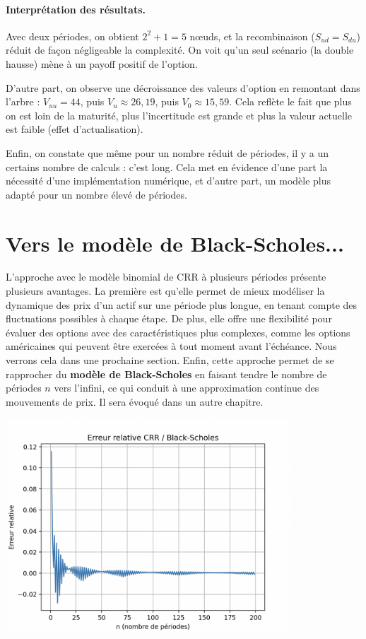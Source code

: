 \documentclass[12pt,a4paper]{article}
\begin{document}
\paragraph{Interprétation des résultats.} Avec deux périodes, on obtient \( 2^2 + 1 = 5 \) nœuds, et la recombinaison (\( S_{ud} = S_{du} \)) réduit de façon négligeable la complexité. On voit qu’un seul scénario (la double hausse) mène à un payoff positif de l’option.

D'autre part, on observe une décroissance des valeurs d’option en remontant dans l’arbre : \( V_{uu} = 44 \), puis \( V_u \approx 26{,}19 \), puis \( V_0 \approx 15{,}59 \). Cela reflète le fait que plus on est loin de la maturité, plus l'incertitude est grande et plus la valeur actuelle est faible (effet d’actualisation).
    
Enfin, on constate que même pour un nombre réduit de périodes, il y a un certains nombre de calculs : c'est long. Cela met en évidence d'une part la nécessité d'une implémentation numérique, et d'autre part, un modèle plus adapté pour un nombre élevé de périodes.



\section{Vers le modèle de Black-Scholes...}

L'approche avec le modèle binomial de CRR à plusieurs périodes présente plusieurs avantages. La première est qu'elle permet de mieux modéliser la dynamique des prix d'un actif sur une période plus longue, en tenant compte des fluctuations possibles à chaque étape. De plus, elle offre une flexibilité pour évaluer des options avec des caractéristiques plus complexes, comme les options américaines qui peuvent être exercées à tout moment avant l'échéance. Nous verrons cela dans une prochaine section. Enfin, cette approche permet de se rapprocher du \textbf{modèle de Black-Scholes} en faisant tendre le nombre de périodes $n$ vers l'infini, ce qui conduit à une approximation continue des mouvements de prix. Il sera évoqué dans un autre chapitre.
\begin{center}
    \includegraphics[width=0.8\textwidth]{../tp_crr/error_plot.png}
\end{center}
\end{document}

